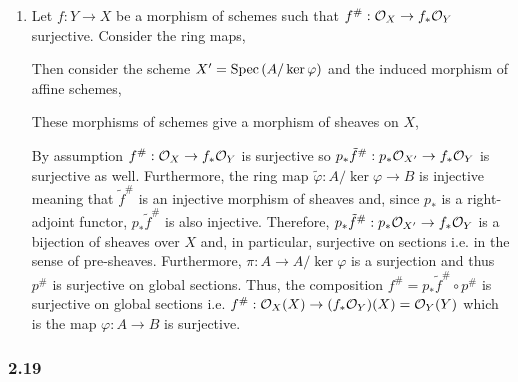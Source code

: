 \documentclass[12pt]{article}
\begin{document}
\begin{enumerate}
\item Let $f : Y \to X$ be a morphism of schemes such that $f^\# : \mathcal{O}_{X} \to f_* \mathcal{O}_{Y}$ surjective. Consider the ring maps,
\begin{center}
\end{center}
Then consider the scheme $X' = \mathrm{Spec}\left( A / \ker{\varphi} \right)$ and the induced morphism of affine schemes,
\begin{center}
\end{center}
These morphisms of schemes give a morphism of sheaves on $X$,
\begin{center}
\end{center}
By assumption $f^\# : \mathcal{O}_{X} \to f_* \mathcal{O}_{Y}$ is surjective so $p_* \tilde{f}^\# : p_* \mathcal{O}_{X'} \to f_* \mathcal{O}_{Y}$ is surjective as well. Furthermore, the ring map $\tilde{\varphi} : A / \ker{\varphi} \to B$ is injective meaning that $\tilde{f}^\#$ is an injective morphism of sheaves and, since $p_*$ is a right-adjoint functor, $p_* \tilde{f}^\#$ is also injective. Therefore, $p_* \tilde{f}^\# : p_* \mathcal{O}_{X'} \to f_* \mathcal{O}_{Y}$ is a bijection of sheaves over $X$ and, in particular, surjective on sections i.e. in the sense of pre-sheaves. Furthermore, $\pi : A \to A / \ker{\varphi}$ is a surjection and thus $p^\#$ is surjective on global sections. Thus, the composition $f^\# = p_* \tilde{f}^\# \circ p^\#$ is surjective on global sections i.e. $f^\# : \mathcal{O}_{X}(X) \to (f_* \mathcal{O}_{Y})(X) = \mathcal{O}_{Y}(Y)$ which is the map $\varphi : A \to B$ is surjective. 
\end{enumerate}

\subsubsection{2.19}
\end{document}
